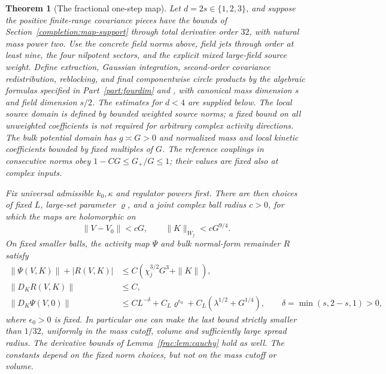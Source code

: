 \documentclass[11pt]{article}
\newtheorem{theorem}{Theorem}
\begin{document}
\begin{theorem}[The fractional one-step map]
\label{completion:map-theorem}
Let \(d=2s\in\{1,2,3\}\), and suppose the positive finite-range
covariance pieces have the bounds of Section~\ref{completion:map-support}
through total derivative order \(32\), with natural mass power two.
Use the concrete field norms above, field jets through order at least
nine, the four nilpotent sectors, and the explicit mixed large-field
source weight. Define extraction, Gaussian integration, second-order covariance
redistribution, reblocking, and final componentwise circle products
by the algebraic formulas specified in Part~\ref{part:fourdim}
and \cite{ParkMap}, with canonical mass dimension \(s\) and field
dimension \(s/2\). The estimates for \(d<4\) are supplied below. The local source domain is defined by bounded weighted source norms;
a fixed bound on all unweighted coefficients is not required for arbitrary
complex activity directions. The bulk potential domain has \(g\asymp G>0\) and normalized
mass and local kinetic coefficients bounded by fixed multiples of
\(G\). The reference couplings in consecutive norms obey
\(1-CG\le G_+/G\le1\); their values are fixed also at complex inputs.

Fix universal admissible \(k_0,\kappa\) and regulator powers first.
There are then choices of fixed \(L\), large-set parameter
\(\varrho\), and a joint complex ball radius \(c>0\),
for which the maps are holomorphic on
\[
 \|V-V_0\|<cG,\qquad \|K\|_{W_j}<cG^{9/4}.
\]
On fixed smaller balls, the activity map \(\Psi\) and bulk normal-form
remainder \(R\) satisfy
\begin{align*}
 \|\Psi(V,K)\|+|R(V,K)|
      &\le C(\chi_j^{3/2}G^3+\|K\|),\\
 \|D_KR(V,K)\|&\le C,\\
 \|D_K\Psi(V,0)\|
      &\le CL^{-\delta}+C_L\varrho^{\epsilon_0}
                     +C_L(\lambda^{1/2}+G^{1/4}),
       \qquad \delta=\min(s,2-s,1)>0,
\end{align*}
where \(\epsilon_0>0\) is fixed. In particular one can make the last
bound strictly smaller than \(1/32\), uniformly in the mass cutoff,
volume and sufficiently large spread radius. The derivative bounds of Lemma~\ref{frac:lem:cauchy} hold as well. The constants depend
on the fixed norm choices, but not on the mass cutoff or volume.
\end{theorem}
\end{document}
